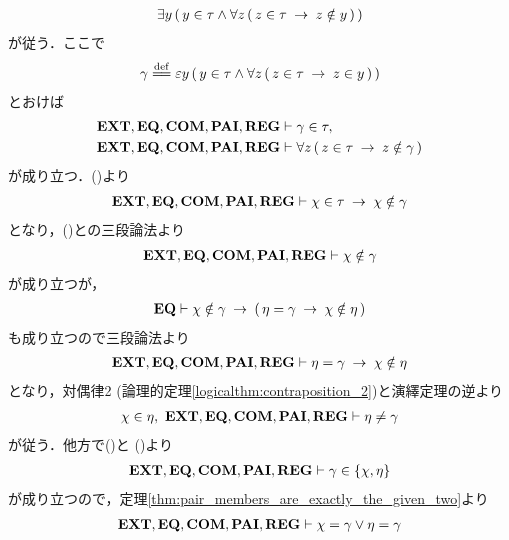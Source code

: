 \begin{sketch}
\begin{align}
			\exists y\, (\, y \in \tau \wedge \forall z\, (\, z \in \tau 
			\hspace{0.25em}\rightarrow\hspace{0.25em} z \notin y\, )\, )
		\end{align}
		が従う．ここで
		\begin{align}
			\gamma \defeq \varepsilon y\, (\, y \in \tau \wedge \forall z\, (\, z \in \tau \rarrow z \in y\, )\, )
		\end{align}
		とおけば
		\begin{align}
			\mbox{{\bf EXT}},\mbox{{\bf EQ}},\mbox{\bf COM},\mbox{{\bf PAI}},\mbox{{\bf REG}} &\vdash \gamma \in \tau, 
			\label{fom:no_pair_of_sets_go_round_4} \\
			\mbox{{\bf EXT}},\mbox{{\bf EQ}},\mbox{\bf COM},\mbox{{\bf PAI}},\mbox{{\bf REG}} &\vdash \forall z\, (\, z \in \tau \hspace{0.25em}\rightarrow\hspace{0.25em} z \notin \gamma\, )
			\label{fom:no_pair_of_sets_go_round_5}
		\end{align}
		が成り立つ．()より
		\begin{align}
			\mbox{{\bf EXT}},\mbox{{\bf EQ}},\mbox{\bf COM},\mbox{{\bf PAI}},\mbox{{\bf REG}} \vdash 
			\chi \in \tau \hspace{0.25em}\rightarrow\hspace{0.25em} \chi \notin \gamma
		\end{align}
		となり，()との三段論法より
		\begin{align}
			\mbox{{\bf EXT}},\mbox{{\bf EQ}},\mbox{\bf COM},\mbox{{\bf PAI}},\mbox{{\bf REG}} \vdash \chi \notin \gamma
			\label{fom:no_pair_of_sets_go_round_8}
		\end{align}
		が成り立つが，
		\begin{align}
			\mbox{{\bf EQ}} \vdash \chi \notin \gamma \hspace{0.25em}\rightarrow\hspace{0.25em} 
			(\, \eta = \gamma \hspace{0.25em}\rightarrow\hspace{0.25em} \chi \notin \eta\, )
		\end{align}
		も成り立つので三段論法より
		\begin{align}
			\mbox{{\bf EXT}},\mbox{{\bf EQ}},\mbox{\bf COM},\mbox{{\bf PAI}},\mbox{{\bf REG}} \vdash 
			\eta = \gamma \hspace{0.25em}\rightarrow\hspace{0.25em} \chi \notin \eta
		\end{align}
		となり，対偶律2 (論理的定理\ref{logicalthm:contraposition_2})と演繹定理の逆より
		\begin{align}
			\chi \in \eta,\ \mbox{{\bf EXT}},\mbox{{\bf EQ}},\mbox{\bf COM},\mbox{{\bf PAI}},\mbox{{\bf REG}} \vdash 
			\eta \neq \gamma
			\label{fom:no_pair_of_sets_go_round_7}
		\end{align}
		が従う．他方で()と
		()より
		\begin{align}
			\mbox{{\bf EXT}},\mbox{{\bf EQ}},\mbox{\bf COM},\mbox{{\bf PAI}},\mbox{{\bf REG}} \vdash \gamma \in \{\chi,\eta\}
		\end{align}
		が成り立つので，定理\ref{thm:pair_members_are_exactly_the_given_two}より
		\begin{align}
			\mbox{{\bf EXT}},\mbox{{\bf EQ}},\mbox{\bf COM},\mbox{{\bf PAI}},\mbox{{\bf REG}} \vdash \chi = \gamma \vee \eta = \gamma
		\end{align}

\end{sketch}
